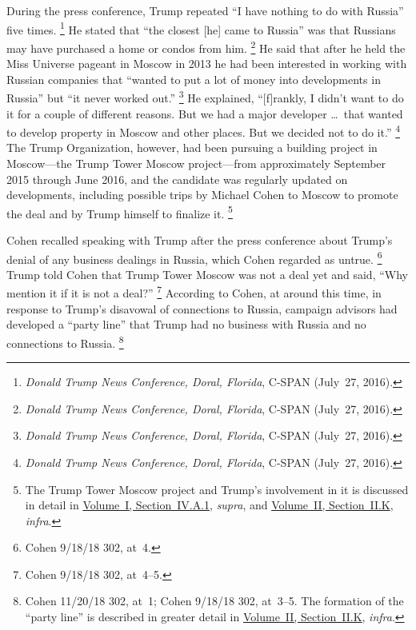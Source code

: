 During the press conference, Trump repeated ``I have nothing to do with Russia'' five times.%
\footnote{\textit{Donald Trump News Conference, Doral, Florida}, C-SPAN (July~27, 2016).}
He stated that ``the closest [he] came to Russia'' was that Russians may have purchased a home or condos from him.%
\footnote{\textit{Donald Trump News Conference, Doral, Florida}, C-SPAN (July~27, 2016).}
He said that after he held the Miss Universe pageant in Moscow in 2013 he had been interested in working with Russian companies that ``wanted to put a lot of money into developments in Russia'' but ``it never worked out.''%
\footnote{\textit{Donald Trump News Conference, Doral, Florida}, C-SPAN (July~27, 2016).}
He explained, ``[f]rankly, I didn't want to do it for a couple of different reasons.
But we had a major developer \dots\ that wanted to develop property in Moscow and other places.
But we decided not to do it.''%
\footnote{\textit{Donald Trump News Conference, Doral, Florida}, C-SPAN (July~27, 2016).}
The Trump Organization, however, had been pursuing a building project in Moscow---the Trump Tower Moscow project---from approximately September 2015 through June 2016, and the candidate was regularly updated on developments, including possible trips by Michael Cohen to Moscow to promote the deal and by Trump himself to finalize it.%
\footnote{The Trump Tower Moscow project and Trump's involvement in it is discussed in detail in \hyperlink{subsubsection.1.4.1.1}{Volume~I, Section~IV.A.1}, \textit{supra}, and \hyperlink{subsection.2.2.11}{Volume~II, Section~II.K}, \textit{infra}.}

Cohen recalled speaking with Trump after the press conference about Trump's denial of any business dealings in Russia, which Cohen regarded as untrue.%
\footnote{Cohen 9/18/18 302, at~4.}
Trump told Cohen that Trump Tower Moscow was not a deal yet and said, ``Why mention it  if it is not a deal?''%
\footnote{Cohen 9/18/18 302, at~4--5.}
According to Cohen, at around this time, in response to Trump's disavowal of connections to Russia, campaign advisors had developed a ``party line'' that Trump had no business with Russia and no connections to Russia.%
\footnote{Cohen 11/20/18 302, at~1;
Cohen 9/18/18 302, at~3--5.
The formation of the ``party line'' is described in greater detail in \hyperlink{subsection.2.2.11}{Volume~II, Section~II.K}, \textit{infra}.}


